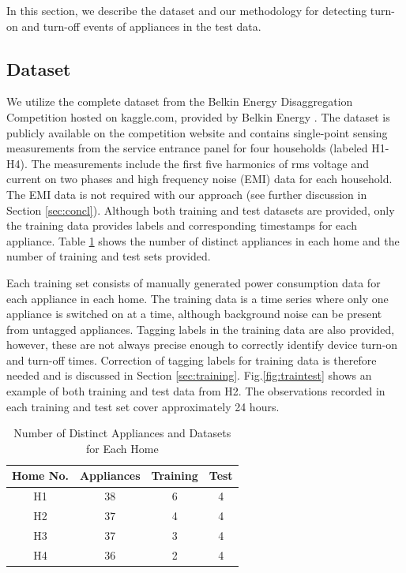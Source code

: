 \documentclass[conference]{IEEEtran}
\begin{document}
In this section, we describe the dataset and our methodology for detecting turn-on and turn-off events of appliances in the test data. 

\subsection{Dataset}
We utilize the complete dataset from the Belkin Energy Disaggregation Competition hosted on kaggle.com, provided by Belkin Energy \cite{Kaggle}.  The dataset is publicly available on the competition website and contains single-point sensing measurements from the service entrance panel for four households (labeled H1-H4).  The measurements include the first five harmonics of rms voltage and current on two phases and high frequency noise (EMI) data for each household.  The EMI data is not required with our approach (see further discussion in Section \ref{sec:concl}).  Although both training and test datasets are provided, only the training data provides labels and corresponding timestamps for each appliance. Table \ref{table:dataset} shows the number of distinct appliances in each home and the number of training and test sets provided. 

Each training set consists of manually generated power consumption data for each appliance in each home.  The training data is a time series where only one appliance is switched on at a time, although background noise can be present from untagged appliances. Tagging labels in the training data are also provided, however, these are not always precise enough to correctly identify device turn-on and turn-off times. Correction of tagging labels for training data is therefore needed and is discussed in Section \ref{sec:training}.  Fig.\ref{fig:traintest} shows an example of both training and test data from H2.  The observations recorded in each training and test set cover approximately 24 hours.  

\begin{table}[!t]
	\renewcommand{\arraystretch}{1.3}
	\caption{Number of Distinct Appliances and Datasets for Each Home}\label{classes}
	\label{table:dataset}
	\centering
	\begin{tabular}{c||c||c||c}
		\hline 
		\textbf{Home No.} & \textbf{Appliances} &\textbf{Training} &\textbf{Test}\tabularnewline
		\hline 
		\hline 
		H1 & 38 & 6 & 4\tabularnewline
		\hline 
		H2 & 37 & 4 & 4\tabularnewline
		\hline 
		H3 & 37 & 3 & 4\tabularnewline
		\hline 
		H4 & 36 & 2 & 4\tabularnewline
		\hline 
	\end{tabular}
\end{table}
\end{document}
